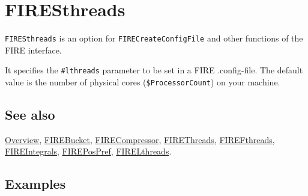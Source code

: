 \documentclass[../FeynHelpersManual.tex]{subfiles}
\begin{document}
\hypertarget{firesthreads}{
\section{FIRESthreads}\label{firesthreads}}

\texttt{FIRESthreads} is an option for \texttt{FIRECreateConfigFile} and
other functions of the FIRE interface.

It specifies the \texttt{\#{}\allowbreak{}lthreads} parameter to be set
in a FIRE .config-file. The default value is the number of physical
cores (\texttt{\$ProcessorCount}) on your machine.

\subsection{See also}

\hyperlink{toc}{Overview}, \hyperlink{firebucket}{FIREBucket},
\hyperlink{firecompressor}{FIRECompressor},
\hyperlink{firethreads}{FIREThreads},
\hyperlink{firefthreads}{FIREFthreads},
\hyperlink{fireintegrals}{FIREIntegrals},
\hyperlink{firepospref}{FIREPosPref},
\hyperlink{firelthreads}{FIRELthreads}.

\subsection{Examples}
\end{document}
